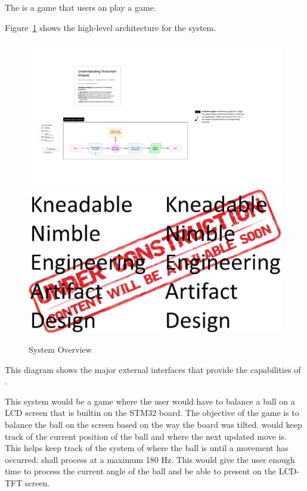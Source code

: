 
The \ThisSystem is a game that users an play a game.

Figure~\ref{fig:SystemOverview} shows the high-level architecture for the \ThisSys system. 
\begin{figure}[htbp]
	\centering
	\ifpdf
			\includegraphics[width=6in]{../zProjectWideData/images/Diagram.pdf}
		\else
			\includegraphics[width=6in]{../zProjectWideData/images/KNEAD_UnderConstruction_100dpi_6.5inchesWide.eps}
		\fi
		\caption{System Overview}
	\label{fig:SystemOverview}
\end{figure}
This diagram shows the major external interfaces that provide the capabilities of \ThisSys.

This system would be a game where the user would have to balance a ball on a LCD screen that is builtin on the STM32 board. The objective of the game is to balance the ball on the screen based on the way the board was tilted.
\ThisSys would keep track of the current position of the ball and where the next updated move is. This helps keep track of the system of where the ball is until a movement has occurred.
\ThisSys shall process at a maximum 180 Hz. This would give the user enough time to process the current angle of the ball and be able to present on the LCD-TFT screen.